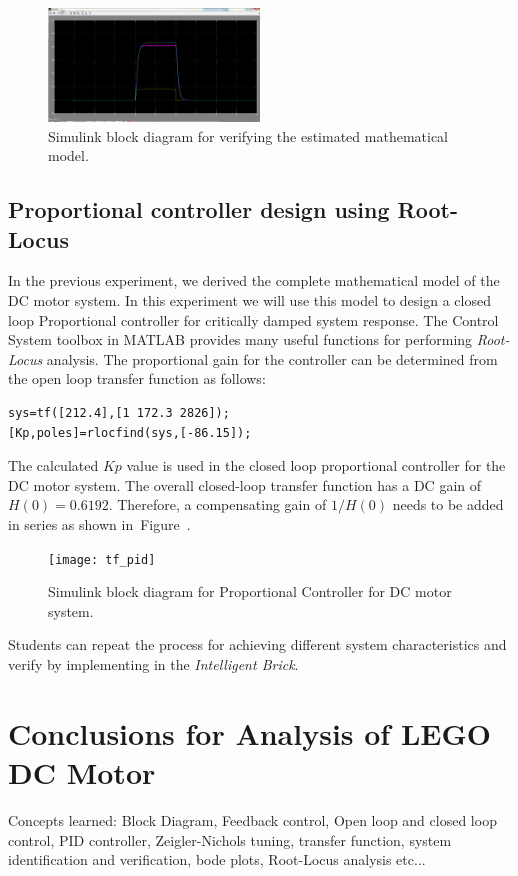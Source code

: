 \documentclass[paper=a4, fontsize=11pt]{scrartcl}
\numberwithin{equation}{section}        %
\numberwithin{figure}{section}          %
\numberwithin{table}{section}           %
\begin{document}
\begin{figure}[!hbp]
	\includegraphics[width=0.5\textwidth]{tf_verify}
	\caption{Simulink block diagram for verifying the estimated mathematical model.}
	\label{fig:tf_verify}
\end{figure}

\subsection{Proportional controller design using Root-Locus}
In the previous experiment, we derived the complete mathematical model of the DC motor system. In this experiment we will use this model to design a closed loop Proportional controller for critically damped system response. The Control System toolbox in MATLAB provides many useful functions for performing \emph{Root-Locus} analysis. The proportional gain for the controller can be determined from the open loop transfer function as follows:
\begin{verbatim}
sys=tf([212.4],[1 172.3 2826]);
[Kp,poles]=rlocfind(sys,[-86.15]);
\end{verbatim}
The calculated $Kp$ value is used in the closed loop proportional controller for the DC motor system. The overall closed-loop transfer function has a DC gain of $H(0)=0.6192$. Therefore, a compensating gain of $1/H(0)$ needs to be added in series as shown in~Figure~\cite{fig:tf_pid}.

\begin{figure}[!hbp]
	\texttt{[image: tf\_pid]}
	\caption{Simulink block diagram for Proportional Controller for DC motor system.}
	\label{fig:tf_pid}
\end{figure}

Students can repeat the process for achieving different system characteristics and verify by implementing in the \emph{Intelligent Brick}.
\section{Conclusions for Analysis of LEGO DC Motor}
Concepts learned: Block Diagram, Feedback control, Open loop and closed loop control, PID controller, Zeigler-Nichols tuning, transfer function, system identification and verification, bode plots, Root-Locus analysis etc...
\end{document}
